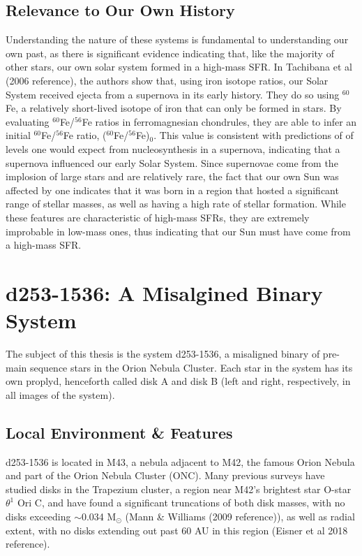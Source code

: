 \subsection{Relevance to Our Own History}
Understanding the nature of these systems is fundamental to understanding our own past, as there is significant evidence indicating that, like the majority of other stars, our own solar system formed in a high-mass SFR. In Tachibana et al (2006 reference), the authors show that, using iron isotope ratios, our Solar System received ejecta from a supernova in its early history. They do so using $^{60}$Fe, a relatively short-lived isotope of iron that can only be formed in stars. By evaluating $^{60}$Fe/$^{56}$Fe ratios in ferromagnesian chondrules, they are able to infer an initial $^{60}$Fe/$^{56}$Fe ratio, ($^{60}$Fe/$^{56}$Fe)$_0$. This value is consistent with predictions of of levels one would expect from nucleosynthesis in a supernova, indicating that a supernova influenced our early Solar System. Since supernovae come from the implosion of large stars and are relatively rare, the fact that our own Sun was affected by one indicates that it was born in a region that hosted a significant range of stellar masses, as well as having a high rate of stellar formation. While these features are characteristic of high-mass SFRs, they are extremely improbable in low-mass ones, thus indicating that our Sun must have come from a high-mass SFR.





\section{d253-1536: A Misalgined Binary System}

The subject of this thesis is the system d253-1536, a misaligned binary of pre-main sequence stars in the Orion Nebula Cluster. Each star in the system has its own proplyd, henceforth called disk A and disk B (left and right, respectively, in all images of the system).

\subsection{Local Environment \& Features}
d253-1536 is located in M43, a nebula adjacent to M42, the famous Orion Nebula and part of the Orion Nebula Cluster (ONC). Many previous surveys have studied disks in the Trapezium cluster, a region near M42's brightest star O-star $\theta^1$ Ori C, and have found a significant truncations of both disk masses, with no disks exceeding $\sim$0.034 M$_\odot$ (Mann \& Williams (2009 reference)), as well as radial extent, with no disks extending out past 60 AU in this region (Eisner et al 2018 reference).

